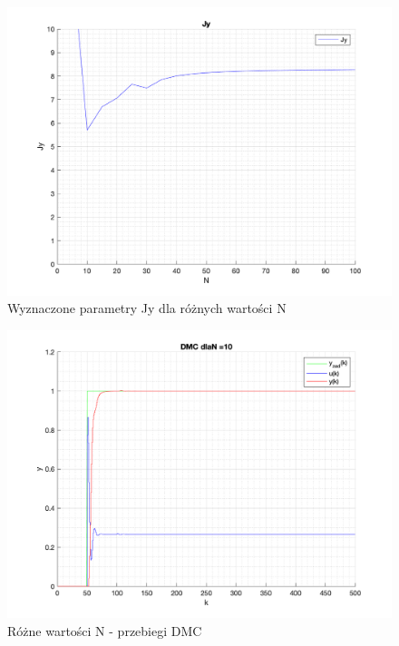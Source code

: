 \documentclass[a4paper, 11pt]{article}
\begin{document}
\begin{enumerate}
 \begin{figure} [H]
\centering
 \includegraphics[width=\linewidth]{./ModelsP4_J/JyN.png} 
 \caption[Wyznaczone parametry Jy dla różnych wartości N]
{Wyznaczone parametry Jy dla różnych wartości N}
 \end{figure}
 
\begin{figure} [H]
\centering
 \includegraphics[width=\linewidth]{./ModelsP4_N/P4_DMC_N_10_png.png} 
 \caption[Różne wartości N - przebiegi DMC]
{Różne wartości N - przebiegi DMC}
 \end{figure}
 

\end{enumerate}
\end{document}

